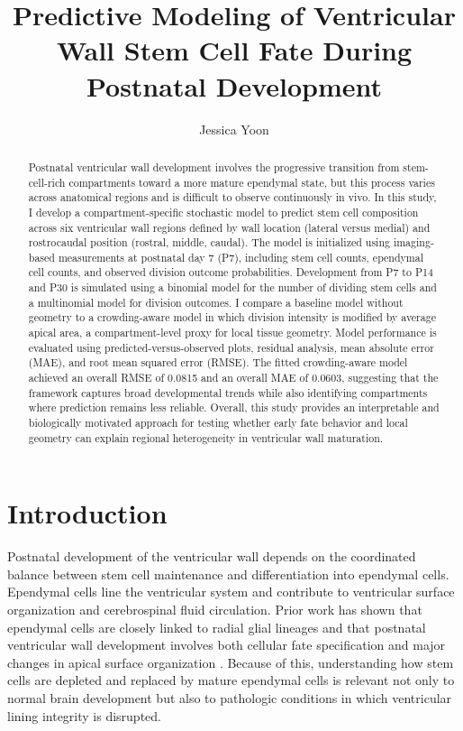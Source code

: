 \documentclass[12pt]{article}
\title{Predictive Modeling of Ventricular Wall Stem Cell Fate During Postnatal Development}
\author{Jessica Yoon}
\date{}
\begin{document}
\maketitle

\begin{abstract}
Postnatal ventricular wall development involves the progressive transition from stem-cell-rich compartments toward a more mature ependymal state, but this process varies across anatomical regions and is difficult to observe continuously in vivo. In this study, I develop a compartment-specific stochastic model to predict stem cell composition across six ventricular wall regions defined by wall location (lateral versus medial) and rostrocaudal position (rostral, middle, caudal). The model is initialized using imaging-based measurements at postnatal day 7 (P7), including stem cell counts, ependymal cell counts, and observed division outcome probabilities. Development from P7 to P14 and P30 is simulated using a binomial model for the number of dividing stem cells and a multinomial model for division outcomes. I compare a baseline model without geometry to a crowding-aware model in which division intensity is modified by average apical area, a compartment-level proxy for local tissue geometry. Model performance is evaluated using predicted-versus-observed plots, residual analysis, mean absolute error (MAE), and root mean squared error (RMSE). The fitted crowding-aware model achieved an overall RMSE of 0.0815 and an overall MAE of 0.0603, suggesting that the framework captures broad developmental trends while also identifying compartments where prediction remains less reliable. Overall, this study provides an interpretable and biologically motivated approach for testing whether early fate behavior and local geometry can explain regional heterogeneity in ventricular wall maturation.
\end{abstract}

\section{Introduction}

Postnatal development of the ventricular wall depends on the coordinated balance between stem cell maintenance and differentiation into ependymal cells. Ependymal cells line the ventricular system and contribute to ventricular surface organization and cerebrospinal fluid circulation. Prior work has shown that ependymal cells are closely linked to radial glial lineages and that postnatal ventricular wall development involves both cellular fate specification and major changes in apical surface organization \citep{Spassky2005, Redmond2019}. Because of this, understanding how stem cells are depleted and replaced by mature ependymal cells is relevant not only to normal brain development but also to pathologic conditions in which ventricular lining integrity is disrupted.
\end{document}

